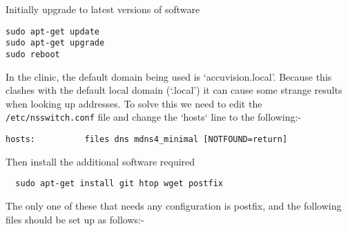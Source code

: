 \documentclass[Draft]{akc}
\begin{document}
Initially upgrade to latest versions of software

\begin{lstlisting}
sudo apt-get update
sudo apt-get upgrade
sudo reboot
\end{lstlisting}

In the clinic, the default domain being used is `accuvision.local'.  Because this clashes with the
default local domain (`.local') it can cause some strange results when looking up addresses. To
solve this we need to edit the \texttt{/etc/nsswitch.conf} file and change the `hosts` line to
the following:-

\begin{lstlisting}
hosts:          files dns mdns4_minimal [NOTFOUND=return]
\end{lstlisting}

Then install the additional software required

\begin{lstlisting}
  sudo apt-get install git htop wget postfix
  \end{lstlisting}

The only one of these that needs any configuration is postfix, and the following files
should be set up as follows:-
\end{document}
